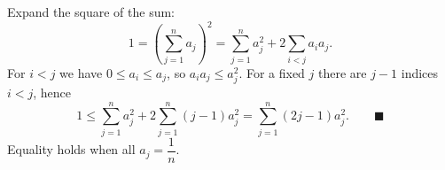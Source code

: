 Expand the square of the sum:
\[1=\left(\sum_{j=1}^na_j\right)^2=\sum_{j=1}^na_j^2+2\sum_{i<j}a_ia_j.\]
For $i<j$ we have $0\le a_i\le a_j$, so $a_ia_j\le a_j^2$. For a fixed $j$ there are $j-1$ indices $i<j$, hence
\[1\le\sum_{j=1}^na_j^2+2\sum_{j=1}^n(j-1)a_j^2=\sum_{j=1}^n(2j-1)a_j^2. \qquad\blacksquare\]
Equality holds when all $a_j=\dfrac1n$.
